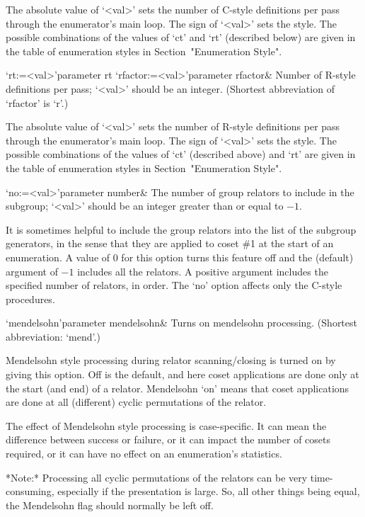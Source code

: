The absolute value of `<val>' sets the
number of C-style definitions per  pass through  the enumerator's main
loop. The sign of `<val>'  sets the  style. The possible  combinations
of the values of `ct' and  `rt'  (described below)  are  given in  the
table of  enumeration styles in Section~"Enumeration Style".

\>`rt:=<val>'{parameter rt}
\>`rfactor:=<val>'{parameter rfactor}&
Number of R-style definitions per pass; `<val>' should be an  integer. 
(Shortest abbreviation of `rfactor' is `r'.)

The absolute value of `<val>' sets the
number of R-style definitions per  pass through  the enumerator's main
loop. The sign of `<val>'  sets the  style. The possible  combinations
of the values of `ct' (described above)  and  `rt'  are  given in  the
table of  enumeration styles in Section~"Enumeration Style".

\>`no:=<val>'{parameter  number}&
The number of group relators to include in the subgroup; `<val>' should
be an integer greater than or equal to $-1$.

It is sometimes helpful to  include the group relators  into the  list  
of the subgroup generators,  in  the sense that they  are  applied  to
coset \#1 at the start of an enumeration. A value of 0 for this option
turns this feature off and the (default) argument of $-1$ includes all
the relators. A  positive argument  includes the  specified  number of
relators, in order. The `no' option affects only the C-style procedures.

\>`mendelsohn'{parameter mendelsohn}&
Turns on mendelsohn processing. (Shortest abbreviation: `mend'.)

Mendelsohn style processing  during relator scanning/closing is turned
on  by  giving  this option.   Off  is  the  default, and  here  coset
applications  are done  only  at the  start  (and end)  of a  relator.
Mendelsohn \lq on' means that  coset  applications  are  done  at  all
(different)  cyclic permutations of  the relator.   

The effect  of Mendelsohn style  processing is case-specific.   It can
mean the difference  between success or failure, or  it can impact the
number  of  cosets   required,  or  it  can  have   no  effect  on  an
enumeration's statistics.

*Note:* Processing all cyclic permutations of the relators can be very
time-consuming,  especially if  the  presentation is  large.  So,  all
other things being equal, the  Mendelsohn flag should normally be left
off.

